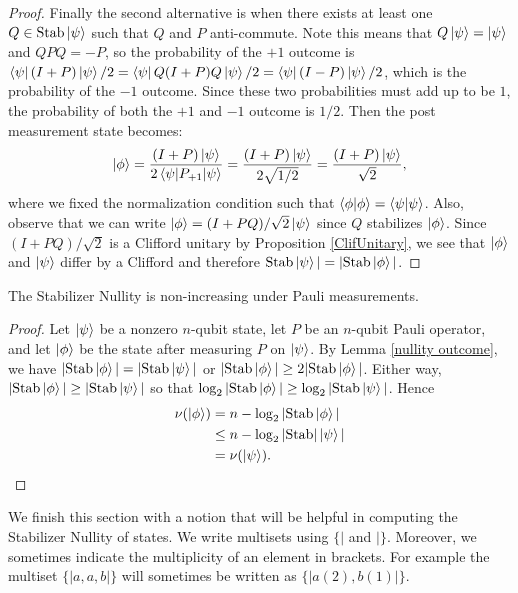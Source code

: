 \documentclass[12pt]{dalthesis}
\begin{document}
\begin{proof}
Finally the second alternative is when there exists at least one $Q \in \mathrm{Stab}\ket{\psi}$ such that $Q$ and $P$ anti-commute. Note this means that $Q\ket{\psi} = \ket{\psi}$ and $QPQ = -P$, so the probability of the $+1$ outcome is $\bra{\psi}(I+P)\ket{\psi}/2 = \bra{\psi}Q(I+P)Q\ket{\psi}/2 = \bra{\psi}(I-P)\ket{\psi}/2$, which is the probability of the $-1$ outcome. Since these two probabilities must add up to be $1$, the probability of both the $+1$ and $-1$ outcome is $1/2$. Then the post measurement state becomes:
\begin{equation*}
\ket{\phi} = \frac{(I+P) \ket{\psi}}{2\braket{\psi | P_{+1} | \psi}} = \frac{(I+P)\ket{\psi}}{2\sqrt{1/2}} = \frac{(I+P)\ket{\psi}}{\sqrt{2}},
\end{equation*}
where we fixed the normalization condition such that $\braket{\phi | \phi} = \braket{\psi | \psi}$. Also, observe that we can write $\ket{\phi} = (I+PQ)/\sqrt{2}\ket{\psi}$ since $Q$ stabilizes $\ket{\phi}$. Since $(I+PQ)/\sqrt{2}$ is a Clifford unitary by Proposition \ref{ClifUnitary}, we see that $\ket{\phi}$ and $\ket{\psi}$ differ by a Clifford and therefore $\mathrm{Stab}\ket{\psi}| = |\mathrm{Stab}\ket{\phi}|$.
\end{proof}

\begin{corollary}
The Stabilizer Nullity is non-increasing under Pauli measurements.
\end{corollary}
\begin{proof}
Let $\ket{\psi}$ be a nonzero $n$-qubit state, let $P$ be an $n$-qubit Pauli operator, and let $\ket{\phi}$ be the state after measuring $P$ on $\ket{\psi}$. By Lemma \ref{nullity outcome}, we have $|\mathrm{Stab}\ket{\phi}| = |\mathrm{Stab}\ket{\psi}|$ or $|\mathrm{Stab}\ket{\phi}| \geq 2|\mathrm{Stab}\ket{\phi}|$. Either way, $|\mathrm{Stab}\ket{\phi}| \geq |\mathrm{Stab}\ket{\psi}|$ so that $\log_2|\mathrm{Stab}\ket{\phi}| \geq \log_2|\mathrm{Stab}\ket{\psi}|$. Hence 
\begin{equation*}
\begin{split}
\nu (\ket{\phi}) & = n - \log_2|\mathrm{Stab}\ket{\phi}| \\
& \leq n - \log_2|\mathrm{Stab}|\ket{\psi}| \\
& = \nu(\ket{\psi}).
\end{split}
\end{equation*}
\end{proof}

We finish this section with a notion that will be helpful in computing the Stabilizer Nullity of states. We write multisets using $\{|$ and $|\}$. Moreover, we sometimes indicate the multiplicity of an element in brackets. For example the multiset $\{| a, a, b |\}$ will sometimes be written as $\{| a (2), b (1) |\}$.
\end{document}

